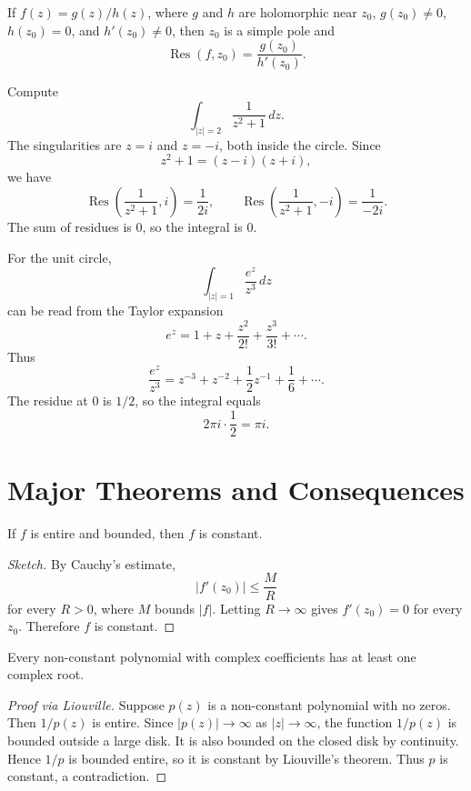 \begin{proposition}
If $f(z)=g(z)/h(z)$, where $g$ and $h$ are holomorphic near $z_0$, $g(z_0)\neq 0$, $h(z_0)=0$, and $h'(z_0)\neq 0$, then $z_0$ is a simple pole and
\[
    \operatorname{Res}(f,z_0)=\frac{g(z_0)}{h'(z_0)}.
\]
\end{proposition}

\newpage

\begin{example}
Compute
\[
    \int_{|z|=2}\frac{1}{z^2+1}\,dz.
\]
The singularities are $z=i$ and $z=-i$, both inside the circle. Since
\[
    z^2+1=(z-i)(z+i),
\]
we have
\[
    \operatorname{Res}\left(\frac{1}{z^2+1},i\right)=\frac{1}{2i},
    \qquad
    \operatorname{Res}\left(\frac{1}{z^2+1},-i\right)=\frac{1}{-2i}.
\]
The sum of residues is $0$, so the integral is $0$.
\end{example}

\begin{example}
For the unit circle,
\[
    \int_{|z|=1}\frac{e^z}{z^3}\,dz
\]
can be read from the Taylor expansion
\[
    e^z=1+z+\frac{z^2}{2!}+\frac{z^3}{3!}+\cdots.
\]
Thus
\[
    \frac{e^z}{z^3}=z^{-3}+z^{-2}+\frac{1}{2}z^{-1}+\frac{1}{6}+\cdots.
\]
The residue at $0$ is $1/2$, so the integral equals
\[
    2\pi i\cdot\frac{1}{2}=\pi i.
\]
\end{example}

\section{Major Theorems and Consequences}

\begin{theorem}
If $f$ is entire and bounded, then $f$ is constant.
\end{theorem}

\begin{proof}[Sketch]
By Cauchy's estimate,
\[
    |f'(z_0)|\leq \frac{M}{R}
\]
for every $R>0$, where $M$ bounds $|f|$. Letting $R\to\infty$ gives $f'(z_0)=0$ for every $z_0$. Therefore $f$ is constant.
\end{proof}

\begin{theorem}
Every non-constant polynomial with complex coefficients has at least one complex root.
\end{theorem}

\begin{proof}[Proof via Liouville]
Suppose $p(z)$ is a non-constant polynomial with no zeros. Then $1/p(z)$ is entire. Since $|p(z)|\to\infty$ as $|z|\to\infty$, the function $1/p(z)$ is bounded outside a large disk. It is also bounded on the closed disk by continuity. Hence $1/p$ is bounded entire, so it is constant by Liouville's theorem. Thus $p$ is constant, a contradiction.
\end{proof}

